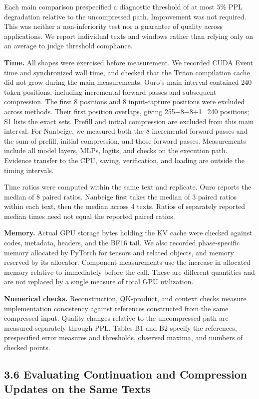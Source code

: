 \documentclass[10pt,a4paper]{article}
\begin{document}
Each main comparison prespecified a diagnostic threshold of at most 5\% PPL degradation relative to the uncompressed path. Improvement was not required. This was neither a non-inferiority test nor a guarantee of quality across applications. We report individual texts and windows rather than relying only on an average to judge threshold compliance.

\textbf{Time.} All shapes were exercised before measurement. We recorded CUDA Event time and synchronized wall time, and checked that the Triton compilation cache did not grow during the main measurements. Ouro's main interval contained 240 token positions, including incremental forward passes and subsequent compression. The first 8 positions and 8 input-capture positions were excluded across methods. Their first position overlaps, giving 255−8−8+1=240 positions; S1 lists the exact sets. Prefill and initial compression are excluded from this main interval. For Nanbeige, we measured both the 8 incremental forward passes and the sum of prefill, initial compression, and those forward passes. Measurements include all model layers, MLPs, logits, and checks on the execution path. Evidence transfer to the CPU, saving, verification, and loading are outside the timing intervals.

Time ratios were computed within the same text and replicate. Ouro reports the median of 8 paired ratios. Nanbeige first takes the median of 3 paired ratios within each text, then the median across 4 texts. Ratios of separately reported median times need not equal the reported paired ratios.

\textbf{Memory.} Actual GPU storage bytes holding the KV cache were checked against codes, metadata, headers, and the BF16 tail. We also recorded phase-specific memory allocated by PyTorch for tensors and related objects, and memory reserved by its allocator. Component measurements use the increase in allocated memory relative to immediately before the call. These are different quantities and are not replaced by a single measure of total GPU utilization.

\textbf{Numerical checks.} Reconstruction, QK-product, and context checks measure implementation consistency against references constructed from the same compressed input. Quality changes relative to the uncompressed path are measured separately through PPL. Tables B1 and B2 specify the references, prespecified error measures and thresholds, observed maxima, and numbers of checked points.

\subsection{3.6 Evaluating Continuation and Compression Updates on the Same Texts}\label{evaluating-continuation-and-compression-updates-on-the-same-texts}
\end{document}
